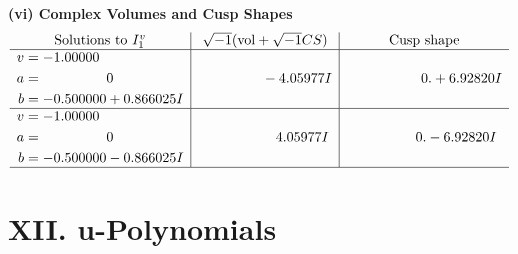 \documentclass[1p]{elsarticle_modified}
\theoremstyle{definition}
\newcommand{\I}{\sqrt{-1}}
\begin{document}
\newpage\flushleft \textbf{(vi) Complex Volumes and Cusp Shapes}
$$\begin{array}{c|c|c}  
\text{Solutions to }I^v_{1}& \I (\text{vol} + \sqrt{-1}CS) & \text{Cusp shape}\\
 \hline 
\begin{aligned}
v &= -1.00000\phantom{ +0.000000I} \\
a &= \phantom{-0.000000 } 0 \\
b &= -0.500000 + 0.866025 I\end{aligned}
 & \phantom{-0.000000 } -4.05977 I & \phantom{-0.000000 -}0. + 6.92820 I \\ \hline\begin{aligned}
v &= -1.00000\phantom{ +0.000000I} \\
a &= \phantom{-0.000000 } 0 \\
b &= -0.500000 - 0.866025 I\end{aligned}
 & \phantom{-0.000000 -}4.05977 I & \phantom{-0.000000 } 0. - 6.92820 I\\
 \hline 
 \end{array}$$\newpage
\newpage\renewcommand{\arraystretch}{1}
\centering \section*{ XII. u-Polynomials}
\end{document}
